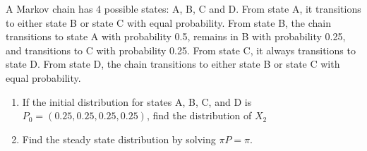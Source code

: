 \item A Markov chain has 4 possible states: A, B, C and D. From state A, it transitions to either state B or state C with equal probability. From state B, the chain transitions to state A with probability 0.5, remains in B with probability 0.25, and transitions to C with probability 0.25. From state C, it always transitions to state D. From state D, the chain transitions to either state B or state C with equal probability. 
\begin{enumerate}
\item If the initial distribution for states A, B, C, and D is $P_0 = (0.25, 0.25, 0.25, 0.25)$, find the distribution of $X_2$



\item Find the steady state distribution by solving $\pi P = \pi$.

\ansfont{
\[
    \begin{cases}
      0.5 \pi_B  = \pi_A\\
      0.5 \pi_A+0.25\pi_B+0.5\pi_D=\pi_B \\
      0.5 \pi_A+0.25\pi_B+0.5\pi_D=\pi_C \\
      \pi_C=\pi_D
    \end{cases}
    \implies
    \begin{cases}
      \pi_A=0.5\pi_B\\
      \pi_B= \pi_C=\pi_D\\
    \end{cases}
    \implies \pi_A=1/7, \quad \pi_B=\pi_C=\pi_D=2/7
  \]
} 
\end{enumerate}